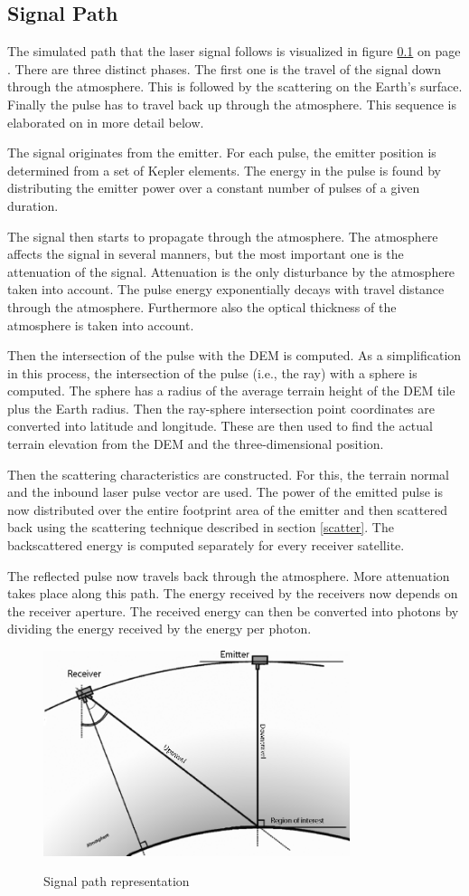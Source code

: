 \subsection{Signal Path}
\label{signPath}

The simulated path that the \ac{laser} signal follows is visualized in figure \ref{signPath} on 
page \pageref{signPath}. There are three distinct phases. The first one is the travel of the
signal down through the atmosphere. This is followed by the scattering on the Earth's surface. Finally the
pulse has to travel back up through the atmosphere. This sequence is elaborated on in more
detail below.

The signal originates from the emitter. For each pulse, the emitter position is determined from
a set of Kepler elements. The energy in the pulse is found by distributing the emitter power over a
constant number of pulses of a given duration.

The signal then starts to propagate through the atmosphere. The atmosphere affects the signal in
several manners, but the most important one is the attenuation of the signal. Attenuation is the
only disturbance by the atmosphere taken into account. The pulse energy exponentially decays with
travel distance through the atmosphere. Furthermore also the optical thickness of the atmosphere is taken into account.

Then the intersection of the pulse with the \ac{DEM} is computed. As a simplification in this
process, the intersection of the pulse (i.e., the ray) with a sphere is computed. The sphere has a radius of
the average terrain height of the \ac{DEM} tile plus the Earth radius. Then the ray-sphere
intersection point coordinates are converted into latitude and longitude. These are then used to 
find the actual terrain elevation from the \ac{DEM} and the three-dimensional position.

Then the scattering characteristics are constructed. For this, the terrain normal and the inbound
laser pulse vector are used. The power of the emitted pulse is now distributed over the entire
footprint area of the emitter and then scattered back using the scattering technique described in
section \ref{scatter}. The backscattered energy is computed separately for every receiver satellite.

The reflected pulse now travels back through the atmosphere. More attenuation takes
place along this path. The energy received by the receivers now depends on the receiver aperture. The received
energy can then be converted into photons by dividing the energy received by the energy per photon.

\begin{figure}[ht!]
	\centering
		\includegraphics[width=0.8\textwidth]{chapters/img/signalPath.png}
		\label{fig:signalPath}
	\caption{Signal path representation}
\end{figure}